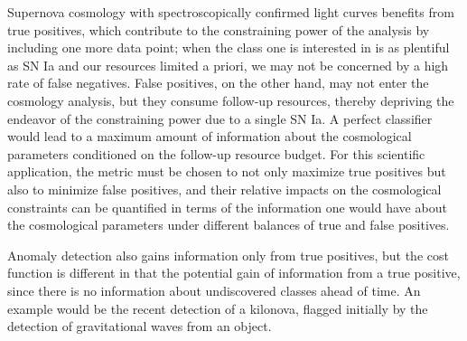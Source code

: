 Supernova cosmology with spectroscopically confirmed light curves benefits from true positives, which contribute to the constraining power of the analysis by including one more data point; when the class one is interested in is as plentiful as SN Ia and our resources limited a priori, we may not be concerned by a high rate of false negatives.
False positives, on the other hand, may not enter the cosmology analysis, but they consume follow-up resources, thereby depriving the endeavor of the constraining power due to a single SN Ia.
A perfect classifier would lead to a maximum amount of information about the cosmological parameters conditioned on the follow-up resource budget.
For this scientific application, the metric must be chosen to not only maximize true positives but also to minimize false positives, and their relative impacts on the cosmological constraints can be quantified in terms of the information one would have about the cosmological parameters under different balances of true and false positives.

Anomaly detection also gains information only from true positives, but the cost function is different in that the potential gain of information from a true positive, since there is no information about undiscovered classes ahead of time. An example would be the recent detection of a kilonova, flagged initially by the detection of gravitational waves from an object.

